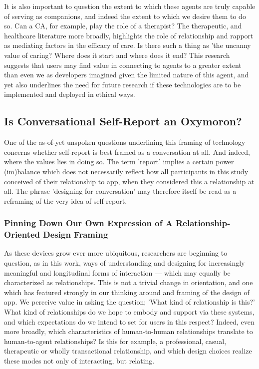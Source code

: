         It is also important to question the extent to which these agents are truly capable of serving as companions, and indeed the extent to which we desire them to do so. Can a \ac{CA}, for example, play the role of a therapist? The therapeutic, and healthcare literature more broadly, highlights the role of relationship and rapport as mediating factors in the efficacy of care. Is there such a thing as 'the uncanny value of caring? Where does it start and where does it end? This research suggests that users may find value in connecting to agents to a greater extent than even we as developers imagined given the limited nature of this agent, and yet also underlines the need for future research if these technologies are to be implemented and deployed in ethical ways.
        
    \subsection{Is Conversational Self-Report an Oxymoron?}
    
        One of the as-of-yet unspoken questions underlining this framing of technology concerns whether self-report is best framed as a conversation at all. And indeed, where the values lies in doing so. The term 'report' implies a certain power (im)balance which does not necessarily reflect how all participants in this study conceived of their relationship to \acl{app}, when they considered this a relationship at all. The phrase 'designing for conversation' may therefore itself be read as a reframing of the very idea of self-report.

        \subsubsection{Pinning Down Our Own Expression of A Relationship-Oriented Design Framing}
        
            As these devices grow ever more ubiquitous, researchers are beginning to question, as in this work, ways of understanding and designing for increasingly meaningful and longitudinal forms of interaction — which may equally be characterized as relationships. This is not a trivial change in orientation, and one which has featured strongly in our thinking around and framing of the design of \acl{app}. We perceive value in asking the question; 'What kind of relationship is this?' What kind of relationships do we hope to embody and support via these systems, and which expectations do we intend to set for users in this respect? Indeed, even more broadly, which characteristics of human-to-human relationships translate to human-to-agent relationships? Is this for example, a professional, casual, therapeutic or wholly transactional relationship, and which design choices realize these modes not only of interacting, but relating. 
            
